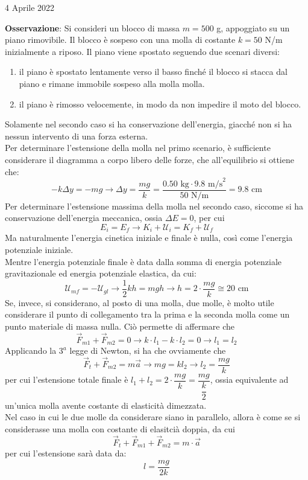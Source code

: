 \documentclass[a4paper]{extarticle}
\begin{document}
\newpage
\noindent
\begin{center}
  4 Aprile 2022
\end{center}
\textbf{Osservazione}: Si consideri un blocco di massa $m=500$ g, appoggiato su un piano rimovibile. Il blocco è sospeso con una molla di costante $k=50$ N/m inizialmente a riposo. Il piano viene spostato seguendo due scenari diversi:
\begin{enumerate}
  \item il piano è spostato lentamente verso il basso finché il blocco si stacca dal piano e rimane immobile sospeso alla molla molla.
  \item il piano è rimosso velocemente, in modo da non impedire il moto del blocco.
\end{enumerate}
Solamente nel secondo caso si ha conservazione dell'energia, giacché non si ha nessun intervento di una forza esterna.\\
Per determinare l'estensione della molla nel primo scenario, è sufficiente considerare il diagramma a corpo libero delle forze, che all'equilibrio si ottiene che:
\[-k\Delta y = - mg \longrightarrow \Delta y = \frac{mg}{k} = \frac{0.50 \text{ kg} \cdot 9.8 \text{ m/s}^2}{50 \text{ N/m}} = 9.8 \text{ cm}\]
Per determinare l'estensione massima della molla nel secondo caso, siccome si ha conservazione dell'energia meccanica, ossia $\Delta E=0$, per cui
\[E_i = E_f \longrightarrow K_i + \mathcal{U}_i = K_f + \mathcal{U}_f\]
Ma naturalmente l'energia cinetica iniziale e finale è nulla, così come l'energia potenziale iniziale.\\
Mentre l'energia potenziale finale è data dalla somma di energia potenziale gravitazionale ed energia potenziale elastica, da cui:
\[\mathcal{U}_{mf}=-\mathcal{U}_{gl} \longrightarrow \frac{1}{2}k h = m g h \longrightarrow h = 2 \cdot \frac{mg}{k} \cong 20 \text{ cm}\]
Se, invece, si considerano, al posto di una molla, due molle, è molto utile considerare il punto di collegamento tra la prima e la seconda molla come un punto materiale di massa nulla. Ciò permette di affermare che
\[\vec F_{m1} + \vec F_{m2} = 0 \longrightarrow k \cdot l_1 - k \cdot l_2 = 0 \longrightarrow l_1 = l_2\]
Applicando la $3^a$ legge di Newton, si ha che ovviamente che
\[\vec F_t + \vec F_{m2} = m \vec a \longrightarrow mg = k l_2 \longrightarrow l_2 = \frac{mg}{k}\]
per cui l'estensione totale finale è $l_1 + l_2 = 2 \cdot \dfrac{mg}{k} = \dfrac{mg}{\dfrac{k}{2}}$, ossia equivalente ad un'unica molla avente costante di elasticità dimezzata.\\
Nel caso in cui le due molle da considerare siano in parallelo, allora è come se si considerasse una molla con costante di elasitcià doppia, da cui
\[\vec F_t + \vec F_{m1} + \vec F_{m2} = m \cdot \vec a\]
per cui l'estensione sarà data da:
\[l=\frac{mg}{2k}\]
\end{document}
